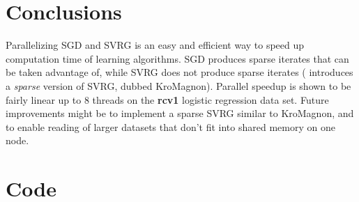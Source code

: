 \documentclass{article}
\begin{document}
\section{Conclusions}
Parallelizing SGD and SVRG is an easy and efficient way to speed up computation time of learning algorithms. SGD produces sparse iterates that can be taken advantage of, while SVRG does not produce sparse iterates (\cite{horia2016} introduces a \textit{sparse} version of SVRG, dubbed KroMagnon). Parallel speedup is shown to be fairly linear up to 8 threads on the \textbf{rcv1} logistic regression data set. Future improvements might be to implement a sparse SVRG similar to KroMagnon, and to enable reading of larger datasets that don't fit into shared memory on one node.




\section{Code}

\inputminted{c++}{../grad_class.h}
\end{document}

